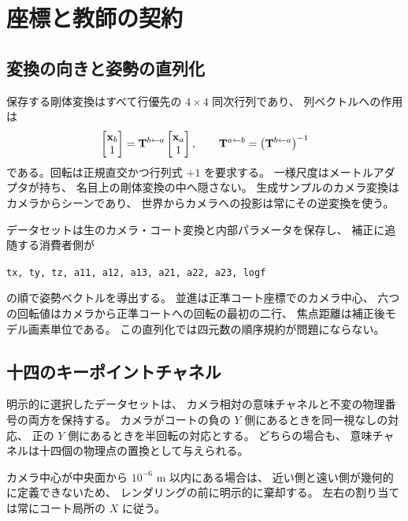 \section{座標と教師の契約}
\label{app:contracts}

\subsection{変換の向きと姿勢の直列化}

保存する剛体変換はすべて行優先の \(4\times4\) 同次行列であり、
列ベクトルへの作用は
\begin{equation}
  \begin{bmatrix}\mathbf{x}_b\\1\end{bmatrix}
    =\mathbf{T}^{b\leftarrow a}\begin{bmatrix}\mathbf{x}_a\\1\end{bmatrix},
  \qquad
  \mathbf{T}^{a\leftarrow b}=\bigl(\mathbf{T}^{b\leftarrow a}\bigr)^{-1}
\end{equation}
である。回転は正規直交かつ行列式 \(+1\) を要求する。
一様尺度はメートルアダプタが持ち、
名目上の剛体変換の中へ隠さない。
生成サンプルのカメラ変換はカメラからシーンであり、
世界からカメラへの投影は常にその逆変換を使う。

データセットは生のカメラ・コート変換と内部パラメータを保存し、
補正に追随する消費者側が
\begin{center}
\texttt{tx, ty, tz, a11, a12, a13, a21, a22, a23, logf}
\end{center}
の順で姿勢ベクトルを導出する。
並進は正準コート座標でのカメラ中心、
六つの回転値はカメラから正準コートへの回転の最初の二行、
焦点距離は補正後モデル画素単位である。
この直列化では四元数の順序規約が問題にならない。

\subsection{十四のキーポイントチャネル}

明示的に選択したデータセットは、
カメラ相対の意味チャネルと不変の物理番号の両方を保持する。
カメラがコートの負の \(Y\) 側にあるときを同一視なしの対応、
正の \(Y\) 側にあるときを半回転の対応とする。
どちらの場合も、
意味チャネルは十四個の物理点の置換として与えられる。

カメラ中心が中央面から \(10^{-6}\) m 以内にある場合は、
近い側と遠い側が幾何的に定義できないため、
レンダリングの前に明示的に棄却する。
左右の割り当ては常にコート局所の \(X\) に従う。

